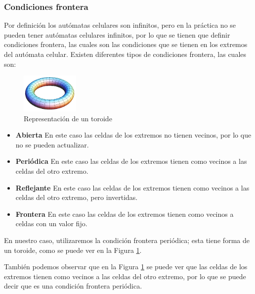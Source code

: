     \subsubsection{Condiciones frontera}
        Por definici\'on los aut\'omatas celulares son infinitos, pero en la pr\'actica no se pueden tener aut\'omatas celulares
            infinitos, por lo que se tienen que definir condiciones frontera, las cuales son las condiciones que se tienen en los
            extremos del aut\'omata celular. Existen diferentes tipos de condiciones frontera, las cuales son:
            \vskip 0.5cm
        \begin{figure}
            \centering
            \includegraphics[width=0.25\textwidth]{./images/marco_teorico/automatas_celulares/torus.png}
            \caption{Representaci\'on de un toroide \cite{Sharma2022}}
            \label{fig:toroide}
        \end{figure}
        \begin{itemize}
            \item \textbf{Abierta} En este caso las celdas de los extremos no tienen vecinos, por lo que no se pueden actualizar.
            \item \textbf{Peri\'odica} En este caso las celdas de los extremos tienen como vecinos a las celdas del otro extremo.
            \item \textbf{Reflejante} En este caso las celdas de los extremos tienen como vecinos a las celdas del otro extremo, pero
                invertidas.
            \item \textbf{Frontera} En este caso las celdas de los extremos tienen como vecinos a celdas con un valor fijo.
        \end{itemize}
    \vskip 0.5cm
    En nuestro caso, utilizaremos la condici\'on frontera peri\'odica; esta tiene forma de un toroide, como se puede ver en la Figura
        \ref{fig:toroide}.
        \vskip 0.5cm
        
        Tambi\'en podemos observar que en la Figura \ref{fig:toroide} se puede ver que las celdas de los extremos tienen como
            vecinos a las celdas del otro extremo, por lo que se puede decir que es una condici\'on frontera peri\'odica.
        \vskip 0.5cm